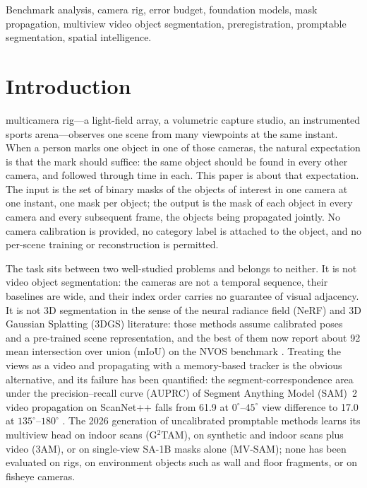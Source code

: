 \documentclass[journal]{IEEEtran}
\begin{document}
\begin{IEEEkeywords}
Benchmark analysis, camera rig, error budget, foundation models, mask
propagation, multiview video object segmentation, preregistration,
promptable segmentation, spatial intelligence.
\end{IEEEkeywords}

\section{Introduction}
\label{sec:intro}
 multicamera rig---a light-field array, a volumetric
capture studio, an instrumented sports arena---observes one scene from many
viewpoints at the same instant. When a person marks one object in one of
those cameras, the natural expectation is that the mark should suffice: the
same object should be found in every other camera, and followed through time
in each. This paper is about that expectation. The input is the set of binary masks
of the objects of interest in one camera at one instant, one mask per object;
the output is the mask of each object in every camera and every subsequent
frame, the objects being propagated jointly. No camera calibration is provided,
no category label is attached to the object, and no per-scene training or
reconstruction is permitted.

The task sits between two well-studied problems and belongs to neither. It is
not video object segmentation: the cameras are not a temporal sequence, their
baselines are wide, and their index order carries no guarantee of visual
adjacency. It is not 3D segmentation in the sense of the neural radiance field
(NeRF) and 3D Gaussian Splatting (3DGS) literature: those methods assume
calibrated poses and a pre-trained scene representation, and the best of them
now report about 92 mean intersection over union (mIoU) on the NVOS benchmark
\cite{sagonline,flashsplat,ludvig}. Treating the views as a video and
propagating with a memory-based tracker is the obvious alternative, and its
failure has been quantified: the segment-correspondence area under the
precision--recall curve (AUPRC) of Segment Anything Model (SAM)~2 video
propagation \cite{sam2} on ScanNet++ falls from 61.9 at
$0^{\circ}$--$45^{\circ}$ view difference to 17.0 at
$135^{\circ}$--$180^{\circ}$ \cite{segmast3r}. The 2026 generation of
uncalibrated promptable methods \cite{mvsam,am3,g2tam} learns its multiview
head on indoor scans (G$^{2}$TAM), on synthetic and indoor scans plus video
(3AM), or on single-view SA-1B masks alone (MV-SAM); none has been evaluated on rigs, on environment objects such as wall
and floor fragments, or on fisheye cameras.
\end{document}

